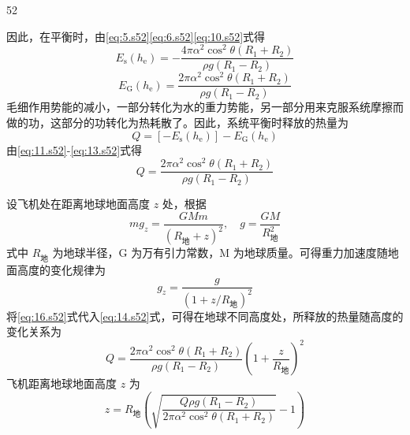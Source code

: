 \begin{solution}{52}
\begin{subsolution}
\begin{equation}
\label{eq:10.s52}
\end{equation}
因此，在平衡时，由\eqref{eq:5.s52}\eqref{eq:6.s52}\eqref{eq:10.s52}式得
\begin{equation}
E_{\mathrm{s}}(h_{\mathrm{e}}) = -\frac{4\pi\alpha^{2}\cos^{2}\theta(R_{1}+R_{2})}{\rho g(R_{1}-R_{2})}
\label{eq:11.s52}
\end{equation}
\begin{equation}
E_{\mathrm{G}}(h_{\mathrm{e}}) = \frac{2\pi\alpha^{2}\cos^{2}\theta(R_{1}+R_{2})}{\rho g(R_{1}-R_{2})}
\label{eq:12.s52}
\end{equation}
毛细作用势能的减小，一部分转化为水的重力势能，另一部分用来克服系统摩擦而做的功，这部分的功转化为热耗散了。因此，系统平衡时释放的热量为
\begin{equation}
Q = [-E_{\mathrm{s}}(h_{\mathrm{e}})] - E_{\mathrm{G}}(h_{\mathrm{e}})
\label{eq:13.s52}
\end{equation}
由\eqref{eq:11.s52}-\eqref{eq:13.s52}式得
\begin{equation}
Q = \frac{2\pi\alpha^{2}\cos^{2}\theta(R_{1}+R_{2})}{\rho g(R_{1}-R_{2})}
\label{eq:14.s52}
\end{equation}
\end{subsolution}
\begin{subsolution}
设飞机处在距离地球地面高度 $z$ 处，根据
\begin{equation}
mg_{z} = \frac{GMm}{(R_{\text{地}}+z)^{2}}, \quad g = \frac{GM}{R_{\text{地}}^{2}}
\label{eq:15.s52}
\end{equation}
式中 $R_{地}$ 为地球半径，G 为万有引力常数，M 为地球质量。可得重力加速度随地面高度的变化规律为
\begin{equation}
g_{z} = \frac{g}{(1+z/R_{\text{地}})^{2}}
\label{eq:16.s52}
\end{equation}
将\eqref{eq:16.s52}式代入\eqref{eq:14.s52}式，可得在地球不同高度处，所释放的热量随高度的变化关系为
\begin{equation}
Q = \frac{2\pi\alpha^{2}\cos^{2}\theta(R_{1}+R_{2})}{\rho g(R_{1}-R_{2})} \left(1+\frac{z}{R_{\text{地}}}\right)^{2}
\label{eq:17.s52}
\end{equation}
飞机距离地球地面高度 $z$ 为
\begin{equation}
z = R_{\text{地}}\left(\sqrt{\frac{Q\rho g(R_{1}-R_{2})}{2\pi\alpha^{2}\cos^{2}\theta(R_{1}+R_{2})}} - 1\right)
\label{eq:18.s52}
\end{equation}
\end{subsolution}
\end{solution}